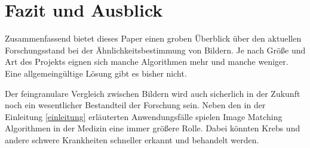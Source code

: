 \section{Fazit und Ausblick}\label{fazit-u-ausblick}
Zusammenfassend bietet dieses Paper einen groben Überblick über den aktuellen
Forschungsstand bei der Ähnlichkeitsbestimmung von Bildern. Je nach Größe und
Art des Projekts eignen sich manche Algorithmen mehr und manche weniger. Eine 
allgemeingültige Lösung gibt es bisher nicht.

Der feingranulare Vergleich zwischen Bildern wird auch sicherlich in der Zukunft
noch ein wesentlicher Bestandteil der Forschung sein. Neben den in der
Einleitung \ref{einleitung} erläuterten Anwendungsfälle spielen Image Matching
Algorithmen in der Medizin eine immer größere Rolle. Dabei könnten Krebs und
andere schwere Krankheiten schneller erkannt und behandelt werden.